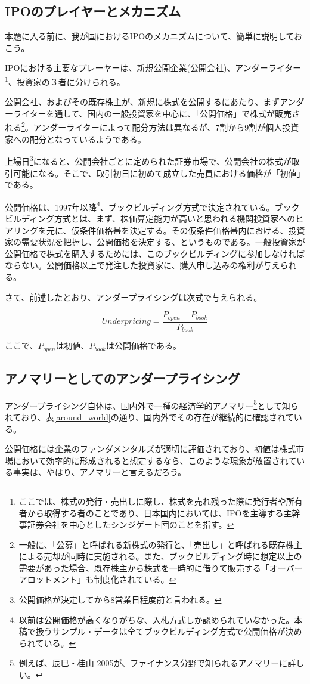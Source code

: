 \documentclass{jsarticle}
\begin{document}
\subsection{IPOのプレイヤーとメカニズム}
本題に入る前に、我が国におけるIPOのメカニズムについて、簡単に説明しておこう。\par
IPOにおける主要なプレーヤーは、新規公開企業(公開会社)、アンダーライター\footnote[3]{ここでは、株式の発行・売出しに際し、株式を売れ残った際に発行者や所有者から取得する者のことであり、日本国内においては、IPOを主導する主幹事証券会社を中心としたシンジゲート団のことを指す。}、投資家の３者に分けられる。\par
公開会社、およびその既存株主が、新規に株式を公開するにあたり、まずアンダーライターを通して、国内の一般投資家を中心に、「公開価格」で株式が販売される\footnote[4]{一般に、「公募」と呼ばれる新株式の発行と、「売出し」と呼ばれる既存株主による売却が同時に実施される。また、ブックビルディング時に想定以上の需要があった場合、既存株主から株式を一時的に借りて販売する「オーバーアロットメント」も制度化されている。}。アンダーライターによって配分方法は異なるが、7割から9割が個人投資家への配分となっているようである。\par
上場日\footnote[5]{公開価格が決定してから8営業日程度前と言われる。}になると、公開会社ごとに定められた証券市場で、公開会社の株式が取引可能になる。そこで、取引初日に初めて成立した売買における価格が「初値」である。\par
公開価格は、1997年以降\footnote[6]{以前は公開価格が高くなりがちな、入札方式しか認められていなかった。本稿で扱うサンプル・データは全てブックビルディング方式で公開価格が決められている。}、ブックビルディング方式で決定されている。ブックビルディング方式とは、まず、株価算定能力が高いと思われる機関投資家へのヒアリングを元に、仮条件価格帯を決定する。その仮条件価格帯内における、投資家の需要状況を把握し、公開価格を決定する、というものである。一般投資家が公開価格で株式を購入するためには、このブックビルディングに参加しなければならない。公開価格以上で発注した投資家に、購入申し込みの権利が与えられる。\\ \par
さて、前述したとおり、アンダープライシングは次式で与えられる。

\begin{equation}
Underpricing = \frac{P_{open} - P_{book}}{P_{book}} \nonumber
\end{equation}
\par
ここで、$P_{open}$は初値、$P_{book}$は公開価格である。


\subsection{アノマリーとしてのアンダープライシング}
アンダープライシング自体は、国内外で一種の経済学的アノマリー\footnote[7]{例えば、辰巳・桂山 2005\cite{tatsumi}が、ファイナンス分野で知られるアノマリーに詳しい。}として知られており、表\ref{around_world}の通り、国内外でその存在が継続的に確認されている。 \par
公開価格には企業のファンダメンタルズが適切に評価されており、初値は株式市場において効率的に形成されると想定するなら、このような現象が放置されている事実は、やはり、アノマリーと言えるだろう。\par
\end{document}
